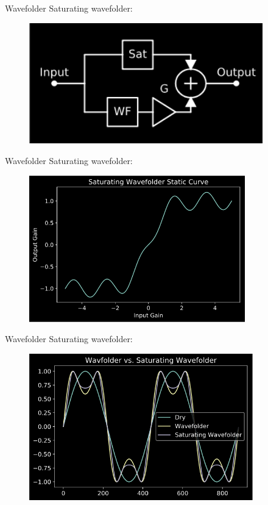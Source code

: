 \begin{frame}{Wavefolder}
    Saturating wavefolder:
    \begin{figure}
        \centering
        \includegraphics[width=4in]{../Wavefolder/Pics/sat_arch}
    \end{figure}
\end{frame}

\begin{frame}{Wavefolder}
    Saturating wavefolder:
    \begin{figure}
        \centering
        \includegraphics[height=2.5in]{../Wavefolder/Pics/sat_static}
    \end{figure}
\end{frame}

\begin{frame}{Wavefolder}
    Saturating wavefolder:
    \begin{figure}
        \centering
        \includegraphics[height=2.5in]{../Wavefolder/Pics/sat_wave}
    \end{figure}
\end{frame}

